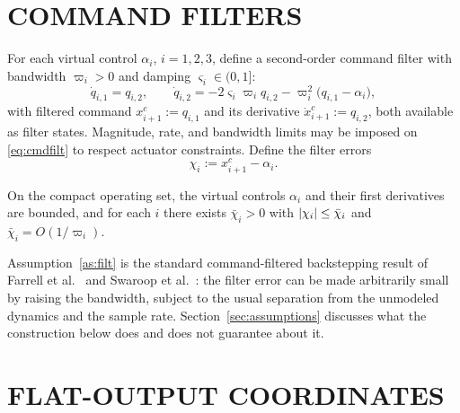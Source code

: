 \section{COMMAND FILTERS}
\label{sec:cmdfilter}

For each virtual control $\alpha_i$, $i=1,2,3$, define a second-order command
filter with bandwidth $\varpi_i>0$ and damping $\varsigma_i\in(0,1]$:
\begin{equation}\label{eq:cmdfilt}
\dot q_{i,1}=q_{i,2},\qquad
\dot q_{i,2}=-2\varsigma_i\varpi_i q_{i,2}-\varpi_i^2\bigl(q_{i,1}-\alpha_i\bigr),
\end{equation}
with filtered command $x_{i+1}^c:=q_{i,1}$ and its derivative
$\dot x_{i+1}^c:=q_{i,2}$, both available as filter states. Magnitude, rate, and
bandwidth limits may be imposed on \eqref{eq:cmdfilt} to respect actuator
constraints. Define the filter errors
\begin{equation}\label{eq:chi}
\chi_i:=x_{i+1}^c-\alpha_i .
\end{equation}

\begin{assumption}\label{as:filt}
On the compact operating set, the virtual controls $\alpha_i$ and their first
derivatives are bounded, and for each $i$ there exists $\bar\chi_i>0$ with
$\left\lvert \chi_i \right\rvert\le\bar\chi_i$ and $\bar\chi_i=O(1/\varpi_i)$.
\end{assumption}

Assumption~\ref{as:filt} is the standard command-filtered backstepping result of
Farrell et al.\ \cite{farrell2009command} and Swaroop et al.\
\cite{swaroop2000dsc}: the filter error can be made
arbitrarily small by raising the bandwidth, subject to the usual separation from
the unmodeled dynamics and the sample rate. Section~\ref{sec:assumptions}
discusses what the construction below does and does not guarantee about it.

\section{FLAT-OUTPUT COORDINATES}
\label{sec:flatcf}

